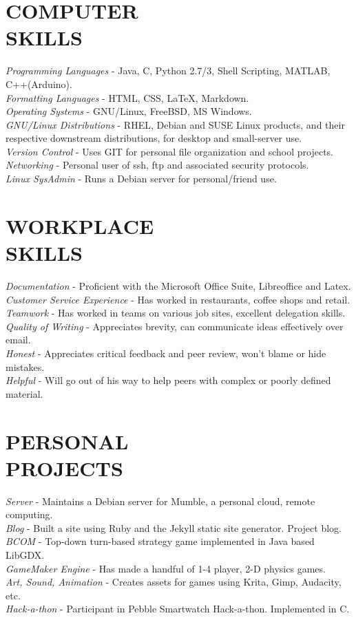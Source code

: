 \documentclass[margin]{res}
\begin{document}
\begin{resume}
\section{COMPUTER \\ SKILLS} {\sl Programming Languages} - Java, C, Python 2.7/3, Shell Scripting, MATLAB, C++(Arduino).\\
                 {\sl Formatting Languages} - HTML, CSS, LaTeX, Markdown.\\
                {\sl Operating Systems} - GNU/Linux, FreeBSD, MS Windows. \\
                 {\sl GNU/Linux Distributions} - RHEL, Debian and SUSE Linux products, and their respective downstream distributions, for desktop and small-server use.\\
                 {\sl Version Control} - Uses GIT for personal file organization and school projects.\\
                 {\sl Networking} - Personal user of ssh, ftp and associated security protocols.\\
                 {\sl Linux SysAdmin} - Runs a Debian server for personal/friend use. 
                 
\section{WORKPLACE \\ SKILLS} 
 {\sl Documentation} - Proficient with the Microsoft Office Suite, Libreoffice and Latex.\\
{\sl Customer Service Experience} - Has worked in restaurants, coffee shops and retail.\\
{\sl Teamwork} - Has worked in teams on various job sites, excellent delegation skills.\\
{\sl Quality of Writing} - Appreciates brevity, can communicate ideas effectively over email.\\
{\sl Honest} - Appreciates critical feedback and peer review, won't blame or hide mistakes.\\
{\sl Helpful} - Will go out of his way to help peers with complex or poorly defined material.



\section{PERSONAL \\ PROJECTS}     
{\sl Server} - Maintains a Debian server for Mumble, a personal cloud, remote computing.\\   
{\sl Blog} - Built a site using Ruby and the Jekyll static site generator. Project blog.\\   
{\sl BCOM} - Top-down turn-based strategy game implemented in Java based LibGDX.\\
{\sl GameMaker Engine} - Has made a handful of 1-4 player, 2-D physics games.\\
{\sl Art, Sound, Animation} - Creates assets for games using Krita, Gimp, Audacity, etc.\\
{\sl Hack-a-thon} - Participant in Pebble Smartwatch Hack-a-thon. Implemented in C.


\end{resume}
\end{document}
